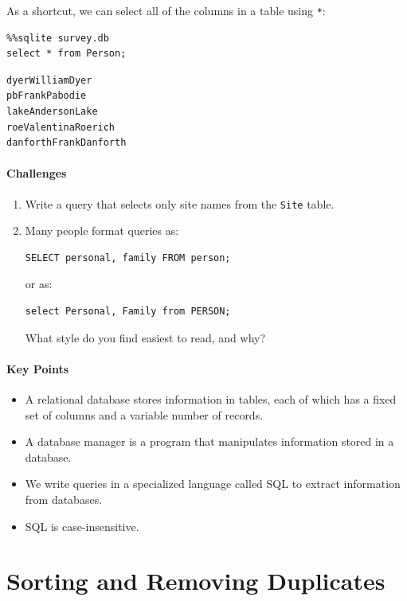 \documentclass[]{book}
\begin{document}
As a shortcut, we can select all of the columns in a table using
\texttt{*}:

\begin{verbatim}
%%sqlite survey.db
select * from Person;
\end{verbatim}

\begin{verbatim}
dyerWilliamDyer
pbFrankPabodie
lakeAndersonLake
roeValentinaRoerich
danforthFrankDanforth
\end{verbatim}

\mbox{}\paragraph{Challenges}

\begin{enumerate}
\item
  Write a query that selects only site names from the \texttt{Site}
  table.
\item
  Many people format queries as:

\begin{verbatim}
SELECT personal, family FROM person;
\end{verbatim}

  or as:

\begin{verbatim}
select Personal, Family from PERSON;
\end{verbatim}

  What style do you find easiest to read, and why?
\end{enumerate}

\mbox{}\paragraph{Key Points}

\begin{itemize}
\item
  A relational database stores information in tables, each of which has
  a fixed set of columns and a variable number of records.
\item
  A database manager is a program that manipulates information stored in
  a database.
\item
  We write queries in a specialized language called SQL to extract
  information from databases.
\item
  SQL is case-insensitive.
\end{itemize}

\section{Sorting and Removing Duplicates}
\end{document}
